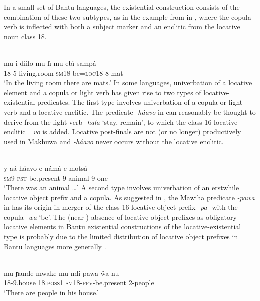 \documentclass[output=paper,draft,draftmode,colorlinks,citecolor=brown]{langscibook}
\begin{document}
In a small set of Bantu languages, the existential construction consists of the combination of these two subtypes, as in the example from  in , where the copula verb is inflected with both a subject marker and an enclitic from the locative noun class 18.

\ea\label{ex:lusoga-livingroom}
\\
\gll mu i-d{\'\i}ilo mu-l{\'\i}-mu eb{\'\i}-samp\'a\\
	18 5-living.room \textsc{sm}18-be=\textsc{loc}18 8-mat\\
\glt `In the living room there are mats.'
\z
In some languages, univerbation of a locative element and a copula or light
verb has given rise to two types of locative-existential predicates. The first type involves univerbation of a copula or light verb and a locative enclitic. The  predicate \textit{-háavo} in  can reasonably be thought to derive from the light verb \textit{-hala} `stay, remain', to which the class 16 locative enclitic \textit{=vo} is added. Locative post-finals are not (or no longer) productively used in Makhuwa and \textit{-háavo} never occurs without the locative enclitic.

\ea\label{ex:makhuwa-animal}
\\
\gll y-aá-háavo e-námá e-motsá\\
	\textsc{sm9-pst}-be.present 9-animal 9-one\\
\glt `There was an animal \ldots{}'
\z
A second type involves univerbation of an erstwhile locative object prefix and a copula. As suggested in \citet{BernanderDevos2018}, the Mawiha predicate \textit{-pawa} in  has its origin in merger of the class 16 locative object prefix \textit{-pa-} with the copula \textit{-wa} `be'. The (near-) absence of locative object prefixes as obligatory locative elements in Bantu existential constructions of the locative-existential type is probably due to the limited distribution of locative object prefixes in Bantu languages more generally \citep{Marlo2015,ZellerXXXX}.

\ea\label{ex:mawiha-house}
\\
\gll mu-ɲande mwake mu-ndi-pawa {\^w}a-nu\\
	18-9.house 18.\textsc{poss}1 \textsc{sm}18-\textsc{pfv}-be.present 2-people\\
\glt `There are people in his house.'
\z
\end{document}
